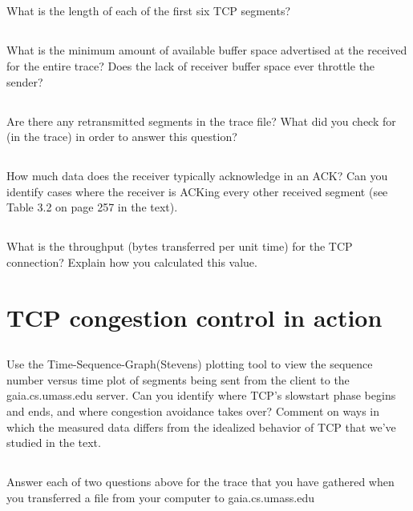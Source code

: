 \documentclass[12pt,letterpaper]{article}
\begin{document}
\subsection{}
What is the length of each of the first six TCP segments?

\subsection{}
What is the minimum amount of available buffer space advertised at the received
for the entire trace? Does the lack of receiver buffer space ever throttle the
sender?

\subsection{}
Are there any retransmitted segments in the trace file? What did you check for (in
the trace) in order to answer this question?

\subsection{}
How much data does the receiver typically acknowledge in an ACK? Can you
identify cases where the receiver is ACKing every other received segment (see
Table 3.2 on page 257 in the text).

\subsection{}
What is the throughput (bytes transferred per unit time) for the TCP connection?
Explain how you calculated this value.

\section{TCP congestion control in action}
\setcounter{subsection}{12}
\subsection{} 
Use the Time-Sequence-Graph(Stevens) plotting tool to view the sequence
number versus time plot of segments being sent from the client to the
gaia.cs.umass.edu server. Can you identify where TCP’s slowstart phase begins
and ends, and where congestion avoidance takes over? Comment on ways in
which the measured data differs from the idealized behavior of TCP that we’ve
studied in the text.

\subsection{}
Answer each of two questions above for the trace that you have gathered when
you transferred a file from your computer to gaia.cs.umass.edu
\end{document}
